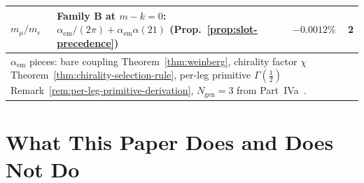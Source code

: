 \documentclass[12pt,a4paper]{article}
\begin{document}
\begin{center}
{\begin{tabular}{llrr}
$m_\mu/m_e$ & Family B at $m{-}k=0$: $\alpha_{\text{em}}/(2\pi)+\alpha_{\text{em}}\alpha(21)$ (Prop.~\ref{prop:slot-precedence}) & $-0.0012\%$ & 2 \\
\hline
\multicolumn{4}{l}{\footnotesize $\alpha_{\text{em}}$ pieces: bare coupling Theorem~\ref{thm:weinberg}, chirality factor $\chi$ Theorem~\ref{thm:chirality-selection-rule}, per-leg primitive $\Gamma(\tfrac{1}{2})$ Remark~\ref{rem:per-leg-primitive-derivation}, $N_{\text{gen}}=3$ from Part~IVa~\cite{part4a}.}\\
\end{tabular}%
}
\end{center}

\section{What This Paper Does and Does Not Do}\label{sec:what-this-paper-does-and-does-not-do}
\end{document}
